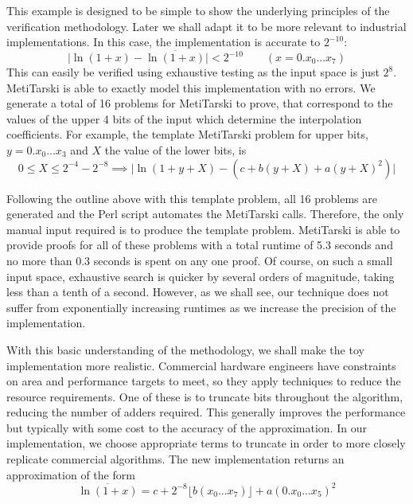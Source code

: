 \documentclass[smallcondensed]{svjour3}
\newcommand{\abs}[1]{\lvert#1\rvert}
\begin{document}
This example is designed to be simple to show the underlying principles of the verification methodology. Later we shall adapt it to be more relevant to industrial implementations. In this case, the implementation is accurate to $2^{-10}$:
$$\abs{\ln(1+x)-\overline{\ln(1+x)}} <2^{-10} \qquad (x= 0.x_0...x_7) $$
This can easily be verified using exhaustive testing as the input space is just $2^8$. MetiTarski is able to exactly model this implementation with no errors. We generate a total of 16 problems for MetiTarski to prove, that correspond to the values of the upper 4 bits of the input which determine the interpolation coefficients. For example, the template MetiTarski problem for upper bits, $y=0.x_0...x_3$ and $X$ the value of the lower bits, is
$$ 0\le X \le 2^{-4}-2^{-8} \implies \abs{\ln(1+y+X)-(c+b(y+X)+a(y+X)^2)} $$

Following the outline above with this template problem, all 16 problems are generated and the Perl script automates the MetiTarski calls. Therefore, the only manual input required is to produce the template problem. MetiTarski is able to provide proofs for all of these problems with a total runtime of 5.3 seconds and no more than 0.3 seconds is spent on any one proof. Of course, on such a small input space, exhaustive search is quicker by several orders of magnitude, taking less than a tenth of a second. However, as we shall see, our technique does not suffer from exponentially increasing runtimes as we increase the precision of the implementation.

With this basic understanding of the methodology, we shall make the toy implementation more realistic. Commercial hardware engineers have constraints on area and performance targets to meet, so they apply techniques to reduce the resource requirements. One of these is to truncate bits throughout the algorithm, reducing the number of adders required. This generally improves the performance but typically with some cost to the accuracy of the approximation. In our implementation, we choose appropriate terms to truncate in order to more closely replicate commercial algorithms. The new implementation returns an approximation of the form 
$$ \overline{\ln(1+x)}=c + 2^{-8} \lfloor{b(x_0...x_7)} \rfloor +a(0.x_0...x_5)^2 $$
\end{document}
